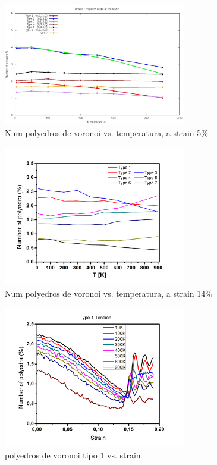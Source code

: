 \documentclass[10pt, oneside]{article} %
\begin{document}
\begin{figure}[H]
\centering
\includegraphics[width=8cm]{Figures/Tension_Voro_Temp_5.jpeg}
\caption{Num polyedros de voronoi vs. temperatura, a strain 5\%}
\end{figure}

\begin{figure}[H]
\centering
\includegraphics[width=8cm]{Figures/poly_T_14strain_TEN.png}
\caption{Num polyedros de voronoi vs. temperatura, a strain 14\%}
\end{figure}

\begin{figure}[H]
\centering
\includegraphics[width=8cm]{Figures/type1_TEN.png}
\caption{polyedros de voronoi tipo 1 vs. strain}
\end{figure}
\end{document}
